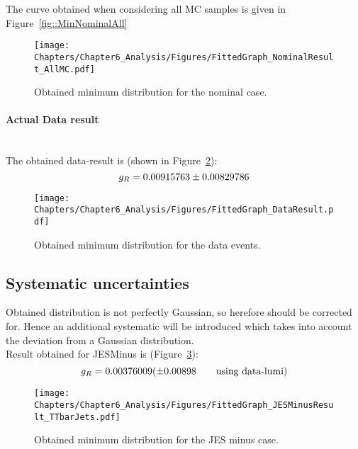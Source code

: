 The curve obtained when considering all MC samples is given in Figure~\ref{fig::MinNominalAll}
\begin{figure}[h!t]
 \centering
 \texttt{[image: Chapters/Chapter6\_Analysis/Figures/FittedGraph\_NominalResult\_AllMC.pdf]}
 \caption{Obtained minimum distribution for the nominal case.} \label{fig::MinNominal}
\end{figure}

\paragraph{Actual Data result} \hfill \\

The obtained data-result is (shown in Figure~\ref{fig::MinData}):
\begin{equation}
 g_{R} = 0.00915763 \pm 0.00829786
\end{equation}

\begin{figure}[h!t]
 \centering
 \texttt{[image: Chapters/Chapter6\_Analysis/Figures/FittedGraph\_DataResult.pdf]}
 \caption{Obtained minimum distribution for the data events.} \label{fig::MinData}
\end{figure}


\subsection{Systematic uncertainties}

Obtained distribution is not perfectly Gaussian, so herefore should be corrected for.
Hence an additional systematic will be introduced which takes into account the deviation from a Gaussian distribution.
\\

Result obtained for JESMinus is (Figure~\ref{fig::MinJESMinus}):
\begin{equation}
 g_{R} = 0.00376009 (\pm 0.00898 \qquad \textrm{using data-lumi})
\end{equation}

\begin{figure}[h!t]
 \centering
 \texttt{[image: Chapters/Chapter6\_Analysis/Figures/FittedGraph\_JESMinusResult\_TTbarJets.pdf]}
 \caption{Obtained minimum distribution for the JES minus case.} \label{fig::MinJESMinus}
\end{figure}

